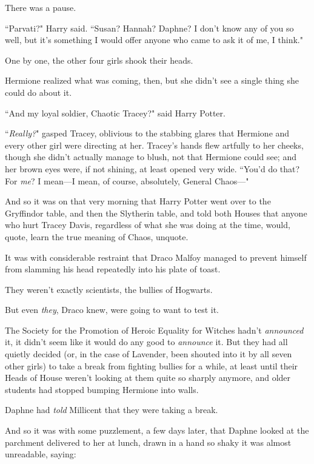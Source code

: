 There was a pause.

``Parvati?" Harry said. ``Susan? Hannah? Daphne? I don't know any of you so well, but it's something I would offer anyone who came to ask it of me, I think."

One by one, the other four girls shook their heads.

Hermione realized what was coming, then, but she didn't see a single thing she could do about it.

``And my loyal soldier, Chaotic Tracey?" said Harry Potter.

``\emph{Really?}" gasped Tracey, oblivious to the stabbing glares that Hermione and every other girl were directing at her. Tracey's hands flew artfully to her cheeks, though she didn't actually manage to blush, not that Hermione could see; and her brown eyes were, if not shining, at least opened very wide. ``You'd do that? For \emph{me}? I mean—I mean, of course, absolutely, General Chaos—"

\later

And so it was on that very morning that Harry Potter went over to the Gryffindor table, and then the Slytherin table, and told both Houses that anyone who hurt Tracey Davis, regardless of what she was doing at the time, would, quote, learn the true meaning of Chaos, unquote.

It was with considerable restraint that Draco Malfoy managed to prevent himself from slamming his head repeatedly into his plate of toast.

They weren't exactly scientists, the bullies of Hogwarts.

But even \emph{they}, Draco knew, were going to want to test it.

\later

The Society for the Promotion of Heroic Equality for Witches hadn't \emph{announced} it, it didn't seem like it would do any good to \emph{announce} it. But they had all quietly decided (or, in the case of Lavender, been shouted into it by all seven other girls) to take a break from fighting bullies for a while, at least until their Heads of House weren't looking at them quite so sharply anymore, and older students had stopped bumping Hermione into walls.

Daphne had \emph{told} Millicent that they were taking a break.

And so it was with some puzzlement, a few days later, that Daphne looked at the parchment delivered to her at lunch, drawn in a hand so shaky it was almost unreadable, saying:

